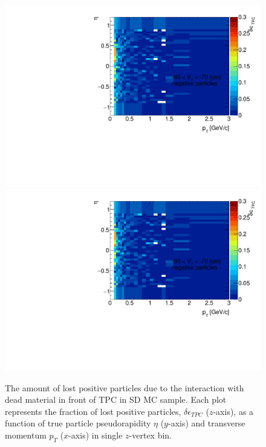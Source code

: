 \begin{figure}[H]
	\caption[The amount of lost positive particles due to the interaction with dead material in front of TPC as a function of $p_T$, $\eta$ and $z$-vertex in SD]{The amount of lost positive particles due to the interaction with dead material in front of TPC in SD MC sample. Each plot represents the fraction of lost positive particles, $\delta\epsilon_{ TPC}$ ($z$-axis), as a function of true particle pseudorapidity $\eta$ ($y$-axis) and transverse momentum $p_{T}$ ($x$-axis) in single $z$-vertex bin.}\label{fig:dead_materialSD3Dpositive}
	\parbox{0.325\textwidth}{
		\includegraphics[width=\linewidth,page=17]{graphics/systematicsEfficiency/deadMaterial/secondaries_Unbinned_Charged_SD.pdf}\\
		\includegraphics[width=\linewidth,page=20]{graphics/systematicsEfficiency/deadMaterial/secondaries_Unbinned_Charged_SD.pdf}\\
}
\end{figure}
